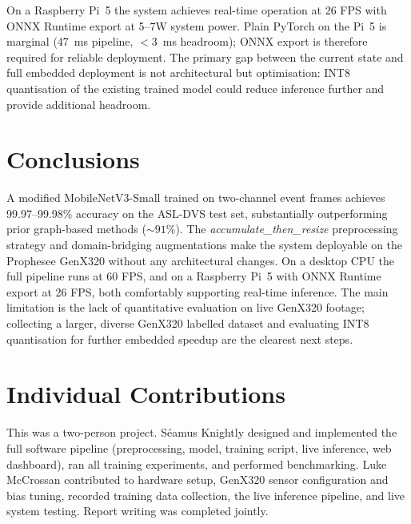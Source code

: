 \documentclass[journal]{IEEEtran}
\begin{document}
On a Raspberry Pi~5 the system achieves real-time operation at 26 FPS with ONNX Runtime export at 5--7W system power. Plain PyTorch on the Pi~5 is marginal (\SI{47}{ms} pipeline, $<$\SI{3}{ms} headroom); ONNX export is therefore required for reliable deployment. The primary gap between the current state and full embedded deployment is not architectural but optimisation: INT8 quantisation of the existing trained model could reduce inference further and provide additional headroom.

\section{Conclusions}

A modified MobileNetV3-Small trained on two-channel event frames achieves 99.97--99.98\% accuracy on the ASL-DVS test set, substantially outperforming prior graph-based methods (${\sim}91\%$). The \textit{accumulate\_then\_resize} preprocessing strategy and domain-bridging augmentations make the system deployable on the Prophesee GenX320 without any architectural changes. On a desktop CPU the full pipeline runs at 60 FPS, and on a Raspberry Pi~5 with ONNX Runtime export at 26 FPS, both comfortably supporting real-time inference. The main limitation is the lack of quantitative evaluation on live GenX320 footage; collecting a larger, diverse GenX320 labelled dataset and evaluating INT8 quantisation for further embedded speedup are the clearest next steps.

\section*{Individual Contributions}

This was a two-person project. Séamus Knightly designed and implemented the full software pipeline (preprocessing, model, training script, live inference, web dashboard), ran all training experiments, and performed benchmarking. Luke McCrossan contributed to hardware setup, GenX320 sensor configuration and bias tuning, recorded training data collection, the live inference pipeline, and live system testing. Report writing was completed jointly.



\end{document}
